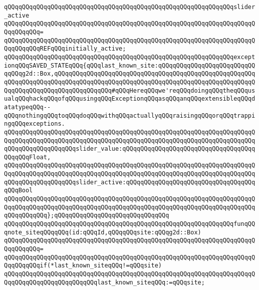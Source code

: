 \newline
\verb|qQQqqQQqqQQqqQQqqQQqqQQqqQQqqQQqqQQqqQQqqQQqqQQqqQQqqQQqqQQqqQQqslider_active|\newline
\verb|qQQqqQQqqQQqqQQqqQQqqQQqqQQqqQQqqQQqqQQqqQQqqQQqqQQqqQQqqQQqqQQqqQQqqQQqqQQqqQQq=|\newline
\verb|qQQqqQQqqQQqqQQqqQQqqQQqqQQqqQQqqQQqqQQqqQQqqQQqqQQqqQQqqQQqqQQqqQQqqQQqqQQqqQQqREFqQQqinitially_active;|\newline
\newline
\newline
\verb|qQQqqQQqqQQqqQQqqQQqqQQqqQQqqQQqqQQqqQQqqQQqqQQqqQQqqQQqqQQqqQQqexceptionqQQqSAVED_STATEqQQq{qQQqlast_known_site:qQQqqQQqqQQqqQQqqQQqqQQqqQQqqQQqg2d::Box,qQQqqQQqqQQqqQQqqQQqqQQqqQQqqQQqqQQqqQQqqQQqqQQqqQQqqQQqqQQqqQQqqQQqqQQqqQQqqQQqqQQqqQQqqQQqqQQqqQQqqQQqqQQqqQQqqQQqqQQqqQQqqQQqqQQqqQQqqQQqqQQqqQQqqQQqqQQq#qQQqHereqQQqwe'reqQQqdoingqQQqtheqQQqusualqQQqhackqQQqofqQQqusingqQQqExceptionqQQqasqQQqanqQQqextensibleqQQqdatatypeqQQq--qQQqnothingqQQqtoqQQqdoqQQqwithqQQqactuallyqQQqraisingqQQqorqQQqtrappingqQQqexceptions.|\newline
\verb|qQQqqQQqqQQqqQQqqQQqqQQqqQQqqQQqqQQqqQQqqQQqqQQqqQQqqQQqqQQqqQQqqQQqqQQqqQQqqQQqqQQqqQQqqQQqqQQqqQQqqQQqqQQqqQQqqQQqqQQqqQQqqQQqqQQqqQQqqQQqqQQqqQQqqQQqqQQqqQQqslider_value:qQQqqQQqqQQqqQQqqQQqqQQqqQQqqQQqqQQqqQQqqQQqFloat,|\newline
\verb|qQQqqQQqqQQqqQQqqQQqqQQqqQQqqQQqqQQqqQQqqQQqqQQqqQQqqQQqqQQqqQQqqQQqqQQqqQQqqQQqqQQqqQQqqQQqqQQqqQQqqQQqqQQqqQQqqQQqqQQqqQQqqQQqqQQqqQQqqQQqqQQqqQQqqQQqqQQqqQQqslider_active:qQQqqQQqqQQqqQQqqQQqqQQqqQQqqQQqqQQqqQQqBool|\newline
\verb|qQQqqQQqqQQqqQQqqQQqqQQqqQQqqQQqqQQqqQQqqQQqqQQqqQQqqQQqqQQqqQQqqQQqqQQqqQQqqQQqqQQqqQQqqQQqqQQqqQQqqQQqqQQqqQQqqQQqqQQqqQQqqQQqqQQqqQQqqQQqqQQqqQQqqQQq};qQQqqQQqqQQqqQQqqQQqqQQqqQQqqQQq|\newline
\newline
\newline
\verb|qQQqqQQqqQQqqQQqqQQqqQQqqQQqqQQqqQQqqQQqqQQqqQQqqQQqqQQqqQQqqQQqfunqQQqnote_siteqQQqqQQq(id:qQQqId,qQQqqQQqsite:qQQqg2d::Box)|\newline
\verb|qQQqqQQqqQQqqQQqqQQqqQQqqQQqqQQqqQQqqQQqqQQqqQQqqQQqqQQqqQQqqQQqqQQqqQQqqQQqqQQq=|\newline
\verb|qQQqqQQqqQQqqQQqqQQqqQQqqQQqqQQqqQQqqQQqqQQqqQQqqQQqqQQqqQQqqQQqqQQqqQQqqQQqqQQqif(*last_known_siteqQQq!=qQQqsite)|\newline
\verb|qQQqqQQqqQQqqQQqqQQqqQQqqQQqqQQqqQQqqQQqqQQqqQQqqQQqqQQqqQQqqQQqqQQqqQQqqQQqqQQqqQQqqQQqqQQqqQQqlast_known_siteqQQq:=qQQqsite;|\newline
